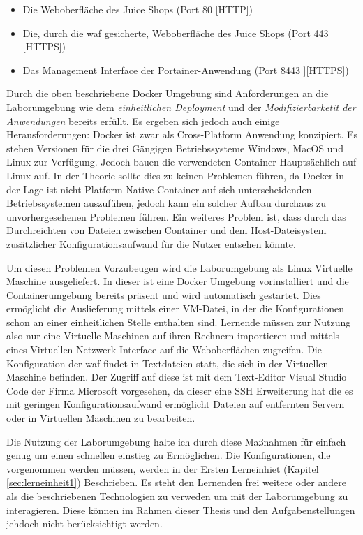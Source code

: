 \begin{itemize}
    \item Die Weboberfläche des Juice Shops (Port 80 [HTTP])
    \item Die, durch die \ac{waf} gesicherte, Weboberfläche des Juice Shops (Port 443 [HTTPS])
    \item Das Management Interface der Portainer-Anwendung (Port 8443 ][HTTPS])
\end{itemize}

Durch die oben beschriebene Docker Umgebung sind Anforderungen an die Laborumgebung wie dem \textit{einheitlichen Deployment} und der \textit{Modifizierbarketit der Anwendungen} bereits erfüllt.
Es ergeben sich jedoch auch einige Herausforderungen:
Docker ist zwar als Cross-Platform Anwendung konzipiert.
Es stehen Versionen für die drei Gängigen Betriebssysteme Windows, MacOS und Linux zur Verfügung.
Jedoch bauen die verwendeten Container Hauptsächlich auf Linux auf.
In der Theorie sollte dies zu keinen Problemen führen, da Docker in der Lage ist nicht Platform-Native Container auf sich unterscheidenden Betriebssystemen auszufühen, jedoch kann ein solcher Aufbau durchaus zu unvorhergesehenen Problemen führen.
Ein weiteres Problem ist, dass durch das Durchreichten von Dateien zwischen Container und dem Host-Dateisystem zusätzlicher Konfigurationsaufwand für die Nutzer entsehen könnte.

Um diesen Problemen Vorzubeugen wird die Laborumgebung als Linux Virtuelle Maschine ausgeliefert.
In dieser ist eine Docker Umgebung vorinstalliert und die Containerumgebung bereits präsent und wird automatisch gestartet.
Dies ermöglicht die Auslieferung mittels einer VM-Datei, in der die Konfigurationen schon an einer einheitlichen Stelle enthalten sind.
Lernende müssen zur Nutzung also nur eine Virtuelle Maschinen auf ihren Rechnern importieren und mittels eines Virtuellen Netzwerk Interface auf die Weboberflächen zugreifen.
Die Konfiguration der \ac{waf} findet in Textdateien statt, die sich in der Virtuellen Maschine befinden.
Der Zugriff auf diese ist mit dem Text-Editor Visual Studio Code der Firma Microsoft vorgesehen, da dieser eine SSH Erweiterung hat die es mit geringen Konfigurationsaufwand ermöglicht Dateien auf entfernten Servern oder in Virtuellen Maschinen zu bearbeiten.

Die Nutzung der Laborumgebung halte ich durch diese Maßnahmen für einfach genug um einen schnellen einstieg zu Ermöglichen.
Die Konfigurationen, die vorgenommen werden müssen, werden in der Ersten Lerneinhiet (Kapitel \ref{sec:lerneinheit1}) Beschrieben.
Es steht den Lernenden frei weitere oder andere als die beschriebenen Technologien zu verweden um mit der Laborumgebung zu interagieren.
Diese können im Rahmen dieser Thesis und den Aufgabenstellungen jehdoch nicht berücksichtigt werden.

\pagebreak